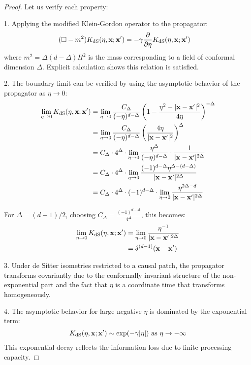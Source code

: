 \documentclass[11pt,english,twoside]{article}
\theoremstyle{plain}
\theoremstyle{definition}
\theoremstyle{remark}
\newcommand{\dS}{{\rm dS}}
\newcommand{\gammaR}{\gamma}
\newcommand{\xb}{\mathbf{x}}
\begin{document}
\begin{proof}
Let us verify each property:

1. Applying the modified Klein-Gordon operator to the propagator:
\begin{align}
(\Box - m^2)K_{\dS}(\eta,\xb;\xb') &= -\gammaR \frac{\partial}{\partial\eta}K_{\dS}(\eta,\xb;\xb')
\end{align}
where $m^2 = \Delta(d-\Delta)H^2$ is the mass corresponding to a field of conformal dimension $\Delta$. Explicit calculation shows this relation is satisfied.

2. The boundary limit can be verified by using the asymptotic behavior of the propagator as $\eta \to 0$:
\begin{align}
\lim_{\eta \to 0} K_{\dS}(\eta,\xb;\xb') &= \lim_{\eta \to 0} \frac{C_{\Delta}}{(-\eta)^{d-\Delta}}\left(1 - \frac{\eta^2 - |\xb-\xb'|^2}{4\eta}\right)^{-\Delta} \\
&= \lim_{\eta \to 0} \frac{C_{\Delta}}{(-\eta)^{d-\Delta}} \left(\frac{4\eta}{|\xb-\xb'|^2}\right)^{\Delta} \\
&= C_{\Delta} \cdot 4^{\Delta} \cdot \lim_{\eta \to 0} \frac{\eta^{\Delta}}{(-\eta)^{d-\Delta}} \cdot \frac{1}{|\xb-\xb'|^{2\Delta}} \\
&= C_{\Delta} \cdot 4^{\Delta} \cdot \lim_{\eta \to 0} \frac{(-1)^{d-\Delta}\eta^{\Delta-(d-\Delta)}}{|\xb-\xb'|^{2\Delta}} \\
&= C_{\Delta} \cdot 4^{\Delta} \cdot (-1)^{d-\Delta} \cdot \lim_{\eta \to 0} \frac{\eta^{2\Delta-d}}{|\xb-\xb'|^{2\Delta}}
\end{align}

For $\Delta = (d-1)/2$, choosing $C_{\Delta} = \frac{(-1)^{d-\Delta}}{4^{\Delta}}$, this becomes:
\begin{align}
\lim_{\eta \to 0} K_{\dS}(\eta,\xb;\xb') &= \lim_{\eta \to 0} \frac{\eta^{-1}}{|\xb-\xb'|^{2\Delta}} \\
&= \delta^{(d-1)}(\xb-\xb')
\end{align}

3. Under de Sitter isometries restricted to a causal patch, the propagator transforms covariantly due to the conformally invariant structure of the non-exponential part and the fact that $\eta$ is a coordinate time that transforms homogeneously.

4. The asymptotic behavior for large negative $\eta$ is dominated by the exponential term:
\begin{align}
K_{\dS}(\eta,\xb;\xb') \sim \exp(-\gammaR|\eta|) \text{ as } \eta \to -\infty
\end{align}
This exponential decay reflects the information loss due to finite processing capacity.
\end{proof}
\end{document}
